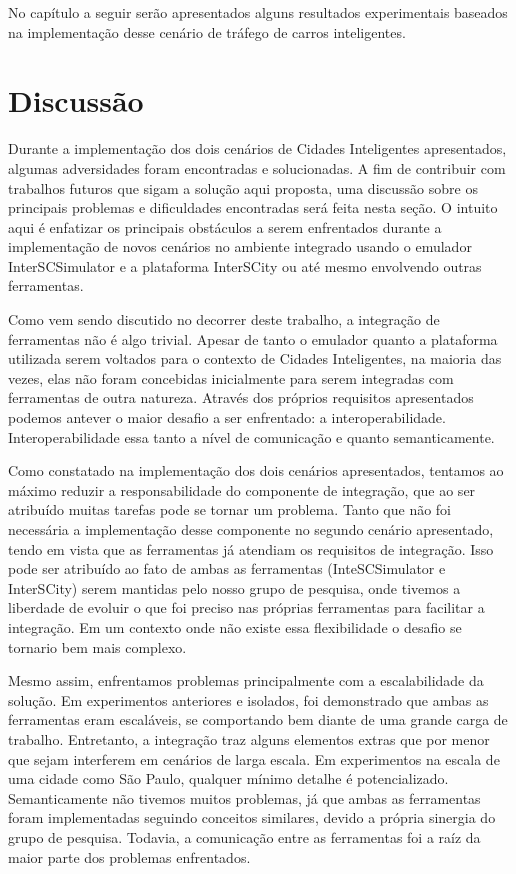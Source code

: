 No capítulo a seguir serão apresentados alguns resultados experimentais baseados na implementação desse cenário de tráfego de carros inteligentes.

\section{Discussão}

Durante a implementação dos dois cenários de Cidades Inteligentes apresentados, algumas adversidades foram encontradas e solucionadas.
A fim de contribuir com trabalhos futuros que sigam a solução aqui proposta, uma discussão sobre os principais problemas e dificuldades encontradas será feita
nesta seção.
O intuito aqui é enfatizar os principais obstáculos a serem enfrentados durante a implementação de novos cenários no ambiente integrado usando o emulador InterSCSimulator e
a plataforma InterSCity ou até mesmo envolvendo outras ferramentas.

Como vem sendo discutido no decorrer deste trabalho, a integração de ferramentas não é algo trivial.
Apesar de tanto o emulador quanto a plataforma utilizada serem voltados para o contexto de Cidades Inteligentes, na maioria das vezes, elas não foram concebidas inicialmente
para serem integradas com ferramentas de outra natureza.
Através dos próprios requisitos apresentados podemos antever o maior desafio a ser enfrentado: a interoperabilidade.
Interoperabilidade essa tanto a nível de comunicação e quanto semanticamente.

Como constatado na implementação dos dois cenários apresentados, tentamos ao máximo reduzir a responsabilidade do componente de integração, que ao ser atribuído muitas
tarefas pode se tornar um problema.
Tanto que não foi necessária a implementação desse componente no segundo cenário apresentado, tendo em vista que as ferramentas já atendiam os requisitos de integração.
Isso pode ser atribuído ao fato de ambas as ferramentas (InteSCSimulator e InterSCity) serem mantidas pelo nosso grupo de pesquisa, onde tivemos a liberdade de evoluir o
que foi preciso nas próprias ferramentas para facilitar a integração.
Em um contexto onde não existe essa flexibilidade o desafio se tornario bem mais complexo.

Mesmo assim, enfrentamos problemas principalmente com a escalabilidade da solução.
Em experimentos anteriores e isolados, foi demonstrado que ambas as ferramentas eram escaláveis, se comportando bem diante de uma grande carga de trabalho.
Entretanto, a integração traz alguns elementos extras que por menor que sejam interferem em cenários de larga escala.
Em experimentos na escala de uma cidade como São Paulo, qualquer mínimo detalhe é potencializado.
Semanticamente não tivemos muitos problemas, já que ambas as ferramentas foram implementadas seguindo conceitos similares, devido a própria sinergia do grupo de
pesquisa.
Todavia, a comunicação entre as ferramentas foi a raíz da maior parte dos problemas enfrentados.

